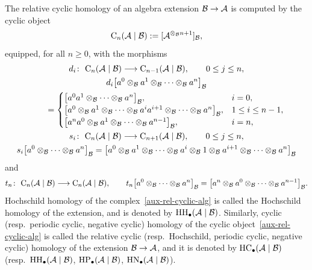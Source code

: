 \documentclass[pdftex]{sigma}
\numberwithin{equation}{section}
\begin{document}
The relative cyclic homology of an algebra extension ${\cal B}\rightarrow {\cal A}$ is computed by the cyclic object
\begin{gather}
\label{aux-rel-cyclic-alg}
{\rm C}_n({\cal A}\mid{\cal B}):=[{\cal A}^{\otimes_{\cal B} n+1}]_{\cal B},
\end{gather}
equipped, for all $n\geq 0$, with the morphisms
\begin{gather*}%
d_i\colon \ {\rm C}_n({\cal A}\mid{\cal B}) \longrightarrow {\rm C}_{n-1}({\cal A}\mid{\cal B}),
\qquad
0 \leq j \leq n,
\\
d_i\big[a^0 \otimes_{\cal B} a^1 \otimes_{\cal B} \dots \otimes_{\cal B} a^n\big]_{\cal B}\\
\qquad{}
=\begin{cases}
\big[a^0 a^1 \otimes_{\cal B} \dots \otimes_{\cal B} a^n \big]_{\cal B}, & i =0,
\\
\big[a^0 \otimes_{\cal B} a^1 \otimes_{\cal B} \dots \otimes_{\cal B} a^i a^{i+1} \otimes_{\cal B} \dots \otimes_{\cal B} a^n \big]_{\cal B},& 1\leq i\leq n-1,
\\
\big[a^n a^0 \otimes_{\cal B} a^1 \otimes_{\cal B} \dots \otimes_{\cal B} a^{n-1}\big]_{\cal B}, & i =n,
\end{cases}
\\
s_i\colon \ {\rm C}_n({\cal A}\mid{\cal B}) \longrightarrow {\rm C}_{n+1}({\cal A}\mid{\cal B}),
\qquad
0 \leq j \leq n,
\\
s_i\big[a^0 \otimes_{\cal B} \dots \otimes_{\cal B} a^n\big]_{\cal B} =\big[a^0 \otimes_{\cal B} a^1
\otimes_{\cal B} \dots \otimes_{\cal B} a^i \otimes_{\cal B} 1 \otimes_{\cal B} a^{i+1} \otimes_{\cal B} \dots
\otimes_{\cal B} a^n \big]_{\cal B}
\end{gather*}
and
\begin{gather*}%
t_n\colon \ {\rm C}_n({\cal A}\mid{\cal B}) \longrightarrow {\rm C}_n({\cal A}\mid{\cal B}),
\qquad
t_n\big[a^0 \otimes_{\cal B} \dots \otimes_{\cal B} a^n\big]_{\cal B} =\big[a^n \otimes_{\cal B} a^0
\otimes_{\cal B} \dots \otimes_{\cal B} a^{n-1}\big]_{\cal B}.
\end{gather*}
Hochschild homology of the complex~\eqref{aux-rel-cyclic-alg} is called the Hochschild homology of the extension, and is
denoted by ${\rm HH}_\bullet({\cal A}\mid{\cal B})$.
Similarly, cyclic (resp.\
periodic cyclic, negative cyclic) homology of the cyclic object~\eqref{aux-rel-cyclic-alg} is called the relative cyclic
(resp.\ Hochschild, periodic cyclic, negative cyclic) homology of the extension ${\cal B} \rightarrow{\cal A}$, and it is
denoted by ${\rm HC}_\bullet({\cal A}\mid{\cal B})$ (resp.\
${\rm HH}_\bullet({\cal A}\mid{\cal B})$, ${\rm HP}_\bullet({\cal A}\mid{\cal B})$, ${\rm HN}_\bullet({\cal A}\mid{\cal B})$).
\end{document}
